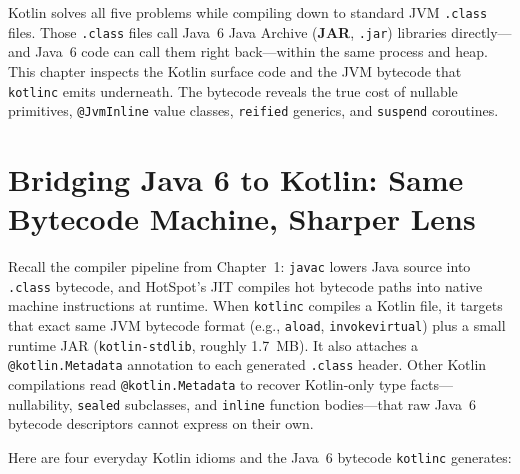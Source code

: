 Kotlin solves all five problems while compiling down to standard JVM \texttt{.class} files. Those \texttt{.class} files call Java~6 Java Archive (\textbf{JAR}, \texttt{.jar}) libraries directly---and Java~6 code can call them right back---within the same process and heap. This chapter inspects the Kotlin surface code and the JVM bytecode that \texttt{kotlinc} emits underneath. The bytecode reveals the true cost of nullable primitives, \texttt{@JvmInline} value classes, \texttt{reified} generics, and \texttt{suspend} coroutines.

\chapterline

\section{Bridging Java 6 to Kotlin: Same Bytecode Machine, Sharper Lens}
\label{ch10:java6-to-kotlin-bridge}

Recall the compiler pipeline from Chapter~1: \texttt{javac} lowers Java source into \texttt{.class} bytecode, and HotSpot's JIT compiles hot bytecode paths into native machine instructions at runtime. When \texttt{kotlinc} compiles a Kotlin file, it targets that exact same JVM bytecode format (e.g., \texttt{aload}, \texttt{invokevirtual}) plus a small runtime JAR (\texttt{kotlin-stdlib}, roughly 1.7~MB). It also attaches a \texttt{@kotlin.Metadata} annotation to each generated \texttt{.class} header. Other Kotlin compilations read \texttt{@kotlin.Metadata} to recover Kotlin-only type facts---nullability, \texttt{sealed} subclasses, and \texttt{inline} function bodies---that raw Java~6 bytecode descriptors cannot express on their own.

Here are four everyday Kotlin idioms and the Java~6 bytecode \texttt{kotlinc} generates:

